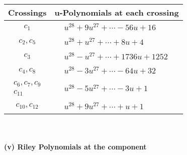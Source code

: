 \documentclass[1p]{elsarticle_modified}
\theoremstyle{definition}
\begin{document}
\begin{tabular}{m{50pt}|m{274pt}}
Crossings & \hspace{64pt}u-Polynomials at each crossing \\
\hline $$\begin{aligned}c_{1}\end{aligned}$$&$\begin{aligned}
&u^{28}+9 u^{27}+\cdots-56 u+16
\end{aligned}$\\
\hline $$\begin{aligned}c_{2},c_{5}\end{aligned}$$&$\begin{aligned}
&u^{28}+u^{27}+\cdots+8 u+4
\end{aligned}$\\
\hline $$\begin{aligned}c_{3}\end{aligned}$$&$\begin{aligned}
&u^{28}- u^{27}+\cdots+1736 u+1252
\end{aligned}$\\
\hline $$\begin{aligned}c_{4},c_{8}\end{aligned}$$&$\begin{aligned}
&u^{28}-3 u^{27}+\cdots-64 u+32
\end{aligned}$\\
\hline $$\begin{aligned}c_{6},c_{7},c_{9}\\c_{11}\end{aligned}$$&$\begin{aligned}
&u^{28}-5 u^{27}+\cdots-3 u+1
\end{aligned}$\\
\hline $$\begin{aligned}c_{10},c_{12}\end{aligned}$$&$\begin{aligned}
&u^{28}+9 u^{27}+\cdots+u+1
\end{aligned}$\\
\hline
\end{tabular}\\~\\
\newpage\renewcommand{\arraystretch}{1}
\flushleft \textbf{(v) Riley Polynomials at the component}\newline \\
\end{document}
